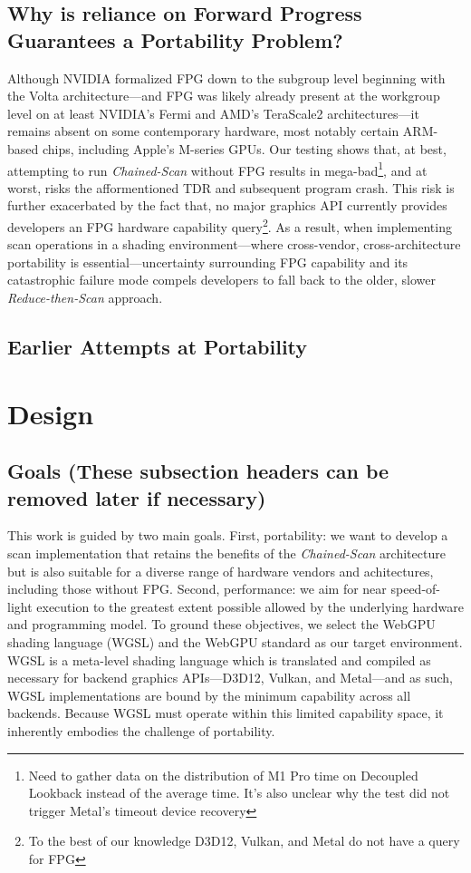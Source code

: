 \documentclass[sigconf]{acmart}
\begin{document}
\subsection{Why is reliance on Forward Progress Guarantees a Portability Problem?}
 Although NVIDIA formalized FPG down to the subgroup level beginning with the Volta architecture---and FPG was likely already present at the workgroup level on at least NVIDIA's Fermi and AMD's TeraScale2 architectures\cite{}---it remains absent on some contemporary hardware, most notably certain ARM-based chips, including Apple's M-series GPUs\cite{10.1145/3485508}. Our testing shows that, at best, attempting to run \emph{Chained-Scan} without FPG results in mega-bad\footnote{Need to gather data on the distribution of M1 Pro time on Decoupled Lookback instead of the average time. It's also unclear why the test did not trigger Metal's timeout device recovery}, and at worst, risks the afformentioned TDR and subsequent program crash. This risk is further exacerbated by the fact that, no major graphics API currently provides developers an FPG hardware capability query\footnote{To the best of our knowledge D3D12, Vulkan, and Metal do not have a query for FPG}. As a result, when implementing scan operations in a shading environment—where cross-vendor, cross-architecture portability is essential—uncertainty surrounding FPG capability and its catastrophic failure mode compels developers to fall back to the older, slower \emph{Reduce-then-Scan} approach.

\subsection{Earlier Attempts at Portability}

\section{Design}
\subsection{Goals (These subsection headers can be removed later if necessary)}
 This work is guided by two main goals. First, portability: we want to develop a scan implementation that retains the benefits of the \emph{Chained-Scan} architecture but is also suitable for a diverse range of hardware vendors and achitectures, including those without FPG. Second, performance: we aim for near speed-of-light execution to the greatest extent possible allowed by the underlying hardware and programming model. To ground these objectives, we select the WebGPU shading language (WGSL) and the WebGPU standard as our target environment. WGSL is a meta-level shading language which is translated and compiled as necessary for backend graphics APIs---D3D12, Vulkan, and Metal---and as such, WGSL implementations are bound by the minimum capability across all backends. Because WGSL must operate within this limited capability space, it inherently embodies the challenge of portability.
\end{document}
